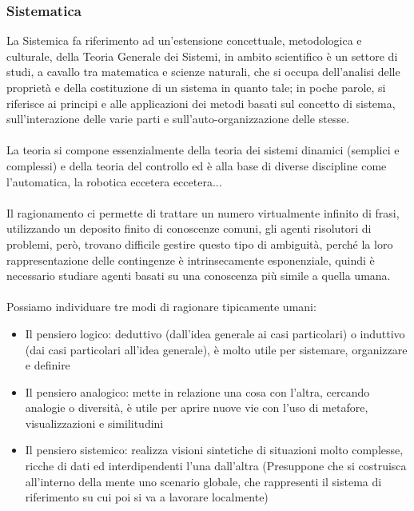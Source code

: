 \documentclass[../main.tex]{subfiles}
\begin{document}
	\subsubsection{Sistematica}
	La Sistemica fa riferimento ad un'estensione concettuale, metodologica e culturale, della Teoria Generale dei Sistemi, in ambito scientifico è un settore di studi, a cavallo tra matematica e scienze naturali, che si occupa dell'analisi delle proprietà e della costituzione di un sistema in quanto tale; in poche parole, si riferisce ai principi e alle applicazioni dei metodi basati sul concetto di sistema, sull'interazione delle varie parti e sull'auto-organizzazione delle stesse.\\\\
	La teoria si compone essenzialmente della teoria dei sistemi dinamici (semplici e complessi) e della teoria del controllo ed è alla base di diverse discipline come l'automatica, la robotica eccetera eccetera...\\\\
	Il ragionamento ci permette di trattare un numero virtualmente infinito di frasi, utilizzando un deposito finito di conoscenze comuni, gli agenti risolutori di problemi, però, trovano difficile gestire questo tipo di ambiguità, perché la loro rappresentazione delle contingenze è intrinsecamente esponenziale, quindi è necessario studiare agenti basati su una conoscenza più simile a quella umana.\\\\
	Possiamo individuare tre modi di ragionare tipicamente umani:
	\begin{itemize}
		\item Il pensiero logico: deduttivo (dall'idea generale ai casi particolari) o induttivo (dai casi particolari all'idea generale), è molto utile per sistemare, organizzare e definire
		\item Il pensiero analogico: mette in relazione una cosa con l'altra, cercando analogie o diversità, è utile per aprire nuove vie con l'uso di metafore, visualizzazioni e similitudini
		\item Il pensiero sistemico: realizza visioni sintetiche di situazioni molto complesse, ricche di dati ed interdipendenti l'una dall'altra (Presuppone che si costruisca all'interno della mente uno scenario globale, che rappresenti il sistema di riferimento su cui poi si va a lavorare localmente)
	\end{itemize}
\end{document}
